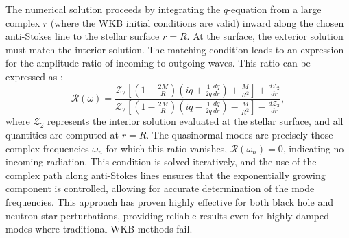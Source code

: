 The numerical solution proceeds by integrating the \(q\)-equation from a large complex \(r\) (where the WKB initial conditions are valid) inward along the chosen anti-Stokes line to the stellar surface \(r = R\). At the surface, the exterior solution must match the interior solution. The matching condition leads to an expression for the amplitude ratio of incoming to outgoing waves. This ratio can be expressed as \cite{Anderson_inverse_cowling}:
\begin{equation}
	\mathcal{R}(\omega) = \frac{ 
		\mathcal{Z}_2 \left[ \left(1 - \frac{2M}{R} \right) \left( i q + \frac{1}{2q} \frac{dq}{dr} \right) + \frac{M}{R^2} \right] + \frac{d\mathcal{Z}_2}{dr}
	}{ 
		\mathcal{Z}_2 \left[ \left(1 - \frac{2M}{R} \right) \left( i q - \frac{1}{2q} \frac{dq}{dr} \right) - \frac{M}{R^2} \right] - \frac{d\mathcal{Z}_2}{dr}
	},
\end{equation}
where \(\mathcal{Z}_2\) represents the interior solution evaluated at the stellar surface, and all quantities are computed at \(r = R\). The quasinormal modes are precisely those complex frequencies \(\omega_n\) for which this ratio vanishes, \(\mathcal{R}(\omega_n) = 0\), indicating no incoming radiation. This condition is solved iteratively, and the use of the complex path along anti-Stokes lines ensures that the exponentially growing component is controlled, allowing for accurate determination of the mode frequencies. This approach has proven highly effective for both black hole and neutron star perturbations, providing reliable results even for highly damped modes where traditional WKB methods fail. 

